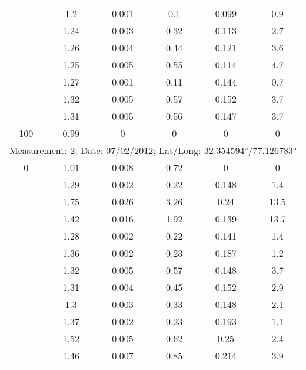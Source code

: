 \begin{longtable}{cccccc}
		& 1.2   & 0.001 & 0.1   & 0.099 & 0.9 \\
		
		& 1.24  & 0.003 & 0.32  & 0.113 & 2.7 \\
		
		& 1.26  & 0.004 & 0.44  & 0.121 & 3.6 \\
		
		& 1.25  & 0.005 & 0.55  & 0.114 & 4.7 \\
		
		& 1.27  & 0.001 & 0.11  & 0.144 & 0.7 \\
		
		& 1.32  & 0.005 & 0.57  & 0.152 & 3.7 \\
		
		& 1.31  & 0.005 & 0.56  & 0.147 & 3.7 \\
		
		100   & 0.99  & 0     & 0     & 0     & 0 \\		
		\midrule
		
		\multicolumn{6}{l}{Measurement: 2; Date: 07/02/2012; 
			Lat/Long: 32.354594°/77.126783°} \\		
		\midrule 	
		0     & 1.01  & 0.008 & 0.72  & 0     & 0 \\
		
		& 1.29  & 0.002 & 0.22  & 0.148 & 1.4 \\
		
		& 1.75  & 0.026 & 3.26  & 0.24  & 13.5 \\
		
		& 1.42  & 0.016 & 1.92  & 0.139 & 13.7 \\
		
		& 1.28  & 0.002 & 0.22  & 0.141 & 1.4 \\
		
		& 1.36  & 0.002 & 0.23  & 0.187 & 1.2 \\
		
		& 1.32  & 0.005 & 0.57  & 0.148 & 3.7 \\
		
		& 1.31  & 0.004 & 0.45  & 0.152 & 2.9 \\
		
		& 1.3   & 0.003 & 0.33  & 0.148 & 2.1 \\
		
		& 1.37  & 0.002 & 0.23  & 0.193 & 1.1 \\
		
		& 1.52  & 0.005 & 0.62  & 0.25  & 2.4 \\
		
		& 1.46  & 0.007 & 0.85  & 0.214 & 3.9 \\
		

\end{longtable}
